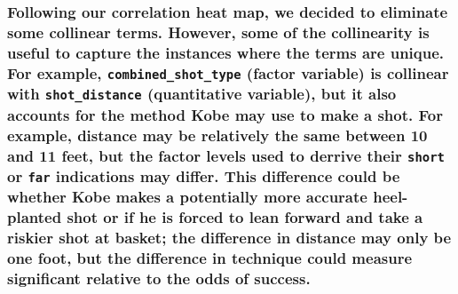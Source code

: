 \documentclass[american,]{article}
\begin{document}
{\subsubsection{\texorpdfstring{Following our correlation heat map, we decided to eliminate some collinear terms. However, some of the collinearity is useful to capture the instances where the terms are unique. For example, \texttt{combined\_shot\_type} (factor variable) is collinear with \texttt{shot\_distance} (quantitative variable), but it also accounts for the method Kobe may use to make a shot. For example, distance may be relatively the same between 10 and 11 feet, but the factor levels used to derrive their \texttt{short} or \texttt{far} indications may differ. This difference could be whether Kobe makes a potentially more accurate heel-planted shot or if he is forced to lean forward and take a riskier shot at basket; the difference in distance may only be one foot, but the difference in technique could measure significant relative to the odds of success.}{Following our correlation heat map, we decided to eliminate some collinear terms. However, some of the collinearity is useful to capture the instances where the terms are unique. For example, combined\_shot\_type (factor variable) is collinear with shot\_distance (quantitative variable), but it also accounts for the method Kobe may use to make a shot. For example, distance may be relatively the same between 10 and 11 feet, but the factor levels used to derrive their short or far indications may differ. This difference could be whether Kobe makes a potentially more accurate heel-planted shot or if he is forced to lean forward and take a riskier shot at basket; the difference in distance may only be one foot, but the difference in technique could measure significant relative to the odds of success.}}\label{following-our-correlation-heat-map-we-decided-to-eliminate-some-collinear-terms.-however-some-of-the-collinearity-is-useful-to-capture-the-instances-where-the-terms-are-unique.-for-example-combined_shot_type-factor-variable-is-collinear-with-shot_distance-quantitative-variable-but-it-also-accounts-for-the-method-kobe-may-use-to-make-a-shot.-for-example-distance-may-be-relatively-the-same-between-10-and-11-feet-but-the-factor-levels-used-to-derrive-their-short-or-far-indications-may-differ.-this-difference-could-be-whether-kobe-makes-a-potentially-more-accurate-heel-planted-shot-or-if-he-is-forced-to-lean-forward-and-take-a-riskier-shot-at-basket-the-difference-in-distance-may-only-be-one-foot-but-the-difference-in-technique-could-measure-significant-relative-to-the-odds-of-success.}}
\end{document}
